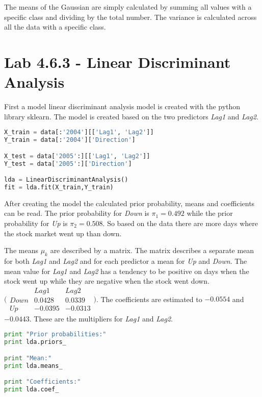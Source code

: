 The means of the Gaussian are simply calculated by summing all values with a specific class and dividing by the total number.
The variance is calculated across all the data with a specific class.

\section{Lab 4.6.3 - Linear Discriminant Analysis}
First a model linear discriminant analysis model is created with the python library sklearn. The model is created based on the two predictors \emph{Lag1} and \emph{Lag2}. 


\begin{lstlisting}[language=Python, label=lst:ldaModel, caption=creating linear discriminant analysis model sklearn]
X_train = data[:'2004'][['Lag1', 'Lag2']]
Y_train = data[:'2004']['Direction']

X_test = data['2005':][['Lag1', 'Lag2']]
Y_test = data['2005':]['Direction']

lda = LinearDiscriminantAnalysis()
fit = lda.fit(X_train,Y_train)
\end{lstlisting}

After creating the model the calculated prior probability, means and coefficients can be read. The prior probability for \emph{Down} is $\pi_1=0.492$ while the prior probability for \emph{Up} is $\pi_2=0.508$. So based on the data there are more days where the stock market went up than down. 

The means $\mu_k$ are described by a matrix. The matrix describes a separate mean for both \emph{Lag1} and \emph{Lag2} and for each predictor a mean for \emph{Up} and \emph{Down}. The mean value for \emph{Lag1} and \emph{Lag2} has a tendency to be positive on days when the stock went up while they are negative when the stock went down.  $\bigl( \begin{smallmatrix} 	 & Lag1 & Lag2	\\ 	 Down & 0.0428 & 0.0339 \\ 	 Up & -0.0395 & -0.0313 \end{smallmatrix} \bigr) $. The coefficients are estimated to $-0.0554$ and $-0.0443$. These are the multipliers for \emph{Lag1} and \emph{Lag2}.

\begin{lstlisting}[language=Python, label=lst:ldaProperties, caption=printing lda prior mean and coefficients]
print "Prior probabilities:"
print lda.priors_

print "Mean:"
print lda.means_

print "Coefficients:"
print lda.coef_
\end{lstlisting}

